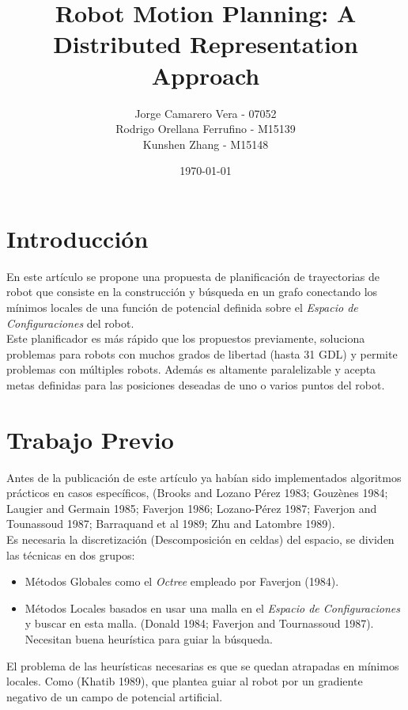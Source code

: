 \documentclass[a4paper, fontsize=11pt]{scrartcl} %
\title{	
	\normalfont \normalsize 
	\huge Robot Motion Planning: A Distributed Representation Approach \\ %
}
\author{Jorge Camarero Vera - 07052\\ Rodrigo Orellana Ferrufino - M15139 \\ Kunshen Zhang - M15148} %
\date{\normalsize\today} %
\numberwithin{equation}{section} %
\numberwithin{figure}{section} %
\numberwithin{table}{section} %
\begin{document}
	\maketitle
	
	\section{Introducción}
	
	En este artículo se propone una propuesta de planificación de trayectorias de robot que consiste en la construcción y búsqueda en un grafo conectando los mínimos locales de una función de potencial definida sobre el \textit{Espacio de Configuraciones} del robot.\\
	
	Este planificador es más rápido que los propuestos previamente, soluciona problemas para robots con muchos grados de libertad (hasta 31 GDL) y permite problemas con múltiples robots. Además es altamente paralelizable y acepta metas definidas para las posiciones deseadas de uno o varios puntos del robot.\\
	
	\section{Trabajo Previo}
	
	Antes de la publicación de este artículo ya habían sido implementados algoritmos prácticos en casos específicos, (Brooks and Lozano Pérez 1983; Gouzènes 1984; Laugier and Germain 1985; Faverjon 1986; Lozano-Pérez 1987; Faverjon and Tounassoud 1987; Barraquand et al 1989; Zhu and Latombre 1989).\\
	
	Es necesaria la discretización (Descomposición en celdas) del espacio, se dividen las técnicas en dos grupos:
	
	\begin{itemize}
		\item Métodos Globales como el \textit{Octree} empleado por Faverjon (1984).
		\item Métodos Locales basados en usar una malla en el \textit{Espacio de Configuraciones} y buscar en esta malla. (Donald 1984; Faverjon and Tournassoud 1987). Necesitan buena heurística para guiar la búsqueda.
	\end{itemize}
	
	El problema de las heurísticas necesarias es que se quedan atrapadas en mínimos locales. Como (Khatib 1989), que plantea guiar al robot por un gradiente negativo de un campo de potencial artificial.\\
	
\end{document}
